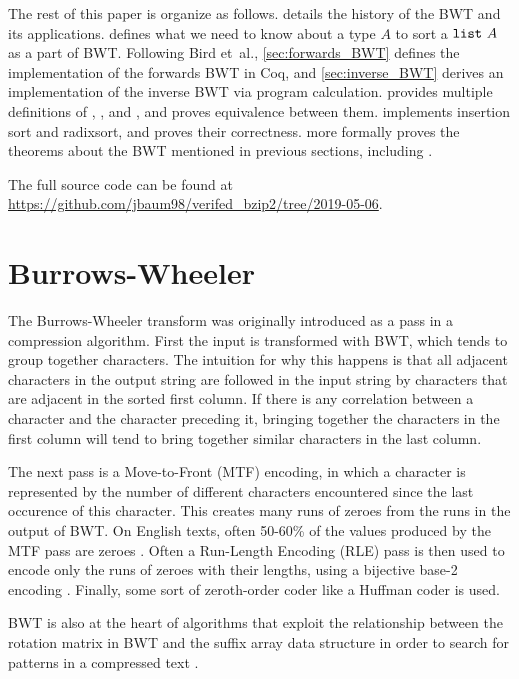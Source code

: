 \documentclass[11pt]{thesis}
\begin{document}
The rest of this paper is organize as follows.  details
the history of the BWT and its applications.  defines
what we need to know about a type $A$ to sort a $\texttt{list}~A$ as a
part of BWT. Following Bird et~al., \cref{sec:forwards_BWT} defines
the implementation of the forwards BWT in Coq, and
\cref{sec:inverse_BWT} derives an implementation of the inverse BWT
via program calculation.  provides
multiple definitions of , , and
, and proves equivalence between them.
 implements insertion sort and radixsort, and proves
their correctness.  more formally proves the
theorems about the BWT mentioned in previous sections, including
.

The full source code can be found at
\url{https://github.com/jbaum98/verifed_bzip2/tree/2019-05-06}.

\section{Burrows-Wheeler}
\label{sec:bwt}

The Burrows-Wheeler transform was originally introduced as a pass in a
compression algorithm. First the input is transformed with BWT, which
tends to group together characters. The intuition for why this happens
is that all adjacent characters in the output string are followed in
the input string by characters that are adjacent in the sorted first
column. If there is any correlation between a character and the
character preceding it, bringing together the characters in the first
column will tend to bring together similar characters in the last
column.

The next pass is a Move-to-Front (MTF) encoding, in which a character
is represented by the number of different characters encountered since
the last occurence of this character. This creates many runs of zeroes
from the runs in the output of BWT. On English texts, often 50-60\% of
the values produced by the MTF pass are zeroes
\cite{fenwick2007,bw-analysis}. Often a Run-Length Encoding (RLE) pass
is then used to encode only the runs of zeroes with their lengths,
using a bijective base-2 encoding \cite{bw-analysis, tsai_2016}.
Finally, some sort of zeroth-order coder like a Huffman coder is used.

BWT is also at the heart of algorithms that exploit the relationship
between the rotation matrix in BWT and the suffix array data structure
in order to search for patterns in a compressed text
\cite{ferragina_index}.
\end{document}
